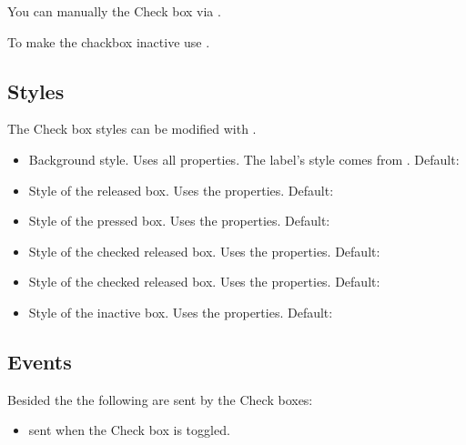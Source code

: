 \documentclass[letterpaper,10pt,english]{sphinxmanual}
\begin{document}
You can manually  the Check box  via .

To make the chackbox inactive use .


\subsection{Styles}
\label{\detokenize{object-types/cb:styles}}
The Check box styles can be modified with .
\begin{itemize}
\item {} 
 Background style. Uses all  properties. The label’s style comes from  . Default: 

\item {} 
 Style of the released box. Uses the  properties. Default: 

\item {} 
 Style of the pressed box. Uses the  properties. Default: 

\item {} 
 Style of the checked released box. Uses the  properties. Default: 

\item {} 
 Style of the checked released box. Uses the  properties. Default: 

\item {} 
 Style of the inactive box. Uses the  properties. Default: 

\end{itemize}


\subsection{Events}
\label{\detokenize{object-types/cb:events}}
Besided the  the following  are sent by the Check boxes:
\begin{itemize}
\item {} 
 sent when the Check box is toggled.

\end{itemize}
\end{document}
